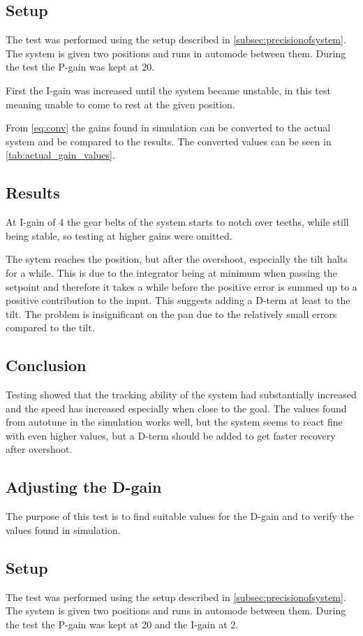 \subsection*{Setup} The test was performed using the setup described in
\ref{subsec:precisionofsystem}. The system is given two positions and runs in
automode between them. During the test the P-gain was kept at 20.

First the I-gain was increased until the system became
unstable, in this test meaning unable to come to rest at the given position.

From \ref{eq:conv} the gains found in simulation can be converted to the actual
system and be compared to the results. The converted values can be seen in
\ref{tab:actual_gain_values}. 

\subsection*{Results} 
At I-gain of 4 the gear belts of the system starts
to notch over teeths, while still being stable, so testing at higher gains were
omitted.

The sytem reaches the position, but after the overshoot,
especially the tilt halts for a while. This is due to the integrator being at
minimum when passing the setpoint and therefore it takes a while before the
positive error is summed up to a positive contribution to the input. This
suggests adding a D-term at least to the tilt. The problem is insignificant on
the pan due to the relatively small errors compared to the tilt.

\subsection*{Conclusion} Testing showed that the tracking ability of the system
had substantially increased and the speed has increased especially when close to
the goal. The values found from autotune in the simulation works well, but the
system seems to react fine with even higher values, but a  D-term should be
added to get faster recovery after overshoot.

\subsection{Adjusting the D-gain}\label{sec:pid_experiments_d}
The purpose of this test is to find suitable values for the D-gain and to verify
the values found in simulation.

\subsection*{Setup}
The test was performed using the setup described in
\ref{subsec:precisionofsystem}. The system is given two positions and runs in automode between them. During the test
the P-gain was kept at 20 and the I-gain at 2.

